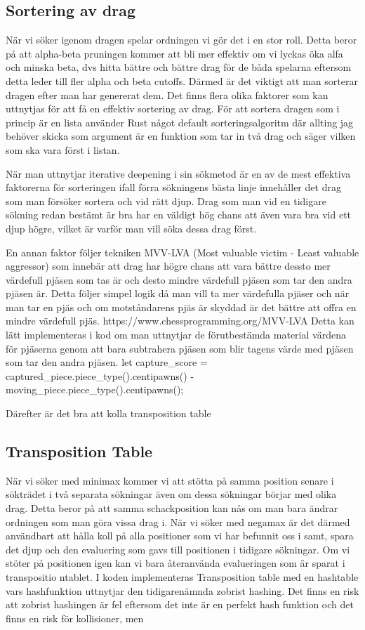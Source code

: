 \documentclass{article}
\begin{document}
\subsection{Sortering av drag}

När vi söker igenom dragen spelar ordningen vi gör det i en stor roll. Detta beror på att alpha-beta pruningen kommer att bli mer effektiv om vi lyckas öka alfa och minska beta, dvs hitta bättre och bättre drag för de båda spelarna eftersom detta leder till fler alpha och beta cutoffs. Därmed är det viktigt att man sorterar dragen efter man har genererat dem. Det finns flera olika faktorer som kan uttnytjas för att få en effektiv sortering av drag. För att sortera dragen som i princip är en lista använder Rust något default sorteringsalgoritm där allting jag behöver skicka som argument är en funktion som tar in två drag och säger vilken som ska vara först i listan.

När man uttnytjar iterative deepening i sin sökmetod är en av de mest effektiva faktorerna för sorteringen ifall förra sökningens bästa linje innehåller det drag som man försöker sortera och vid rätt djup. Drag som man vid en tidigare sökning redan bestämt är bra har en väldigt hög chans att även vara bra vid ett djup högre, vilket är varför man vill söka dessa drag först.

En annan faktor följer tekniken MVV-LVA (Most valuable victim - Least valuable aggressor) som innebär att drag har högre chans att vara bättre dessto mer värdefull pjäsen som tas är och desto mindre värdefull pjäsen som tar den andra pjäsen är. Detta följer simpel logik då man vill ta mer värdefulla pjäser och när man tar en pjäs och om motståndarens pjäs är skyddad är det bättre att offra en mindre värdefull pjäs.
https://www.chessprogramming.org/MVV-LVA
Detta kan lätt implementeras i kod om man uttnytjar de förutbestämda material värdena för pjäserna genom att bara subtrahera pjäsen som blir tagens värde med pjäsen som tar den andra pjäsen.
let capture_score = captured_piece.piece_type().centipawns() - moving_piece.piece_type().centipawns();

Därefter är det bra att kolla transposition table


\subsection{Transposition Table}

När vi söker med minimax kommer vi att stötta på samma position senare i sökträdet i två separata sökningar även om dessa sökningar börjar med olika drag. Detta beror på att samma schackposition kan nås om man bara ändrar ordningen som man göra vissa drag i. När vi söker med negamax är det därmed användbart att hålla koll på alla positioner som vi har befunnit oss i samt, spara det djup och den evaluering som gavs till positionen i tidigare sökningar. Om vi stöter på positionen igen kan vi bara återanvända evalueringen som är sparat i transpositio ntablet. I koden implementeras Transposition table med en hashtable vars hashfunktion uttnytjar den tidigarenämnda zobrist hashing. Det finns en risk att zobrist hashingen är fel eftersom det inte är en perfekt hash funktion och det finns en risk för kollisioner, men

\begin{thebibliography}{9}

\end{thebibliography}
\end{document}
